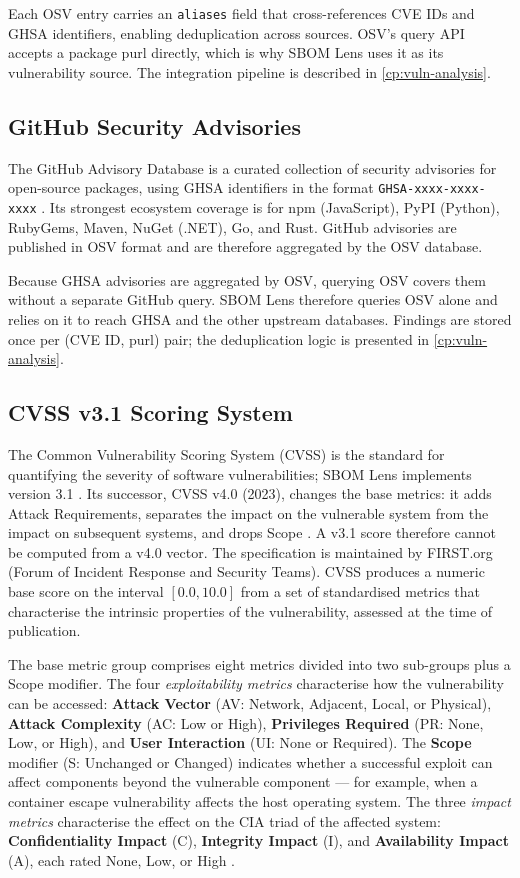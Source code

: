 Each OSV entry carries an \texttt{aliases} field that cross-references CVE IDs and GHSA identifiers, enabling deduplication across sources. OSV's query API accepts a package purl directly, which is why SBOM Lens uses it as its vulnerability source. The integration pipeline is described in \autoref{cp:vuln-analysis}.


\subsection{GitHub Security Advisories}
\label{sec:ghsa}

The GitHub Advisory Database is a curated collection of security advisories for open-source packages, using GHSA identifiers in the format \texttt{GHSA-xxxx-xxxx-xxxx} \citep{GHSA}. Its strongest ecosystem coverage is for npm (JavaScript), PyPI (Python), RubyGems, Maven, NuGet (.NET), Go, and Rust. GitHub advisories are published in OSV format and are therefore aggregated by the OSV database.

Because GHSA advisories are aggregated by OSV, querying OSV covers them without a separate GitHub query. SBOM Lens therefore queries OSV alone and relies on it to reach GHSA and the other upstream databases. Findings are stored once per (CVE ID, purl) pair; the deduplication logic is presented in \autoref{cp:vuln-analysis}.


\subsection{CVSS v3.1 Scoring System}
\label{sec:cvss}

The Common Vulnerability Scoring System (CVSS) is the standard for quantifying the severity of software vulnerabilities; SBOM Lens implements version 3.1 \citep{CVSS31}. Its successor, CVSS v4.0 (2023), changes the base metrics: it adds Attack Requirements, separates the impact on the vulnerable system from the impact on subsequent systems, and drops Scope \citep{CVSS40}. A v3.1 score therefore cannot be computed from a v4.0 vector. The specification is maintained by FIRST.org (Forum of Incident Response and Security Teams). CVSS produces a numeric base score on the interval \([0.0, 10.0]\) from a set of standardised metrics that characterise the intrinsic properties of the vulnerability, assessed at the time of publication.

The base metric group comprises eight metrics divided into two sub-groups plus a Scope modifier. The four \textit{exploitability metrics} characterise how the vulnerability can be accessed: \textbf{Attack Vector} (AV: Network, Adjacent, Local, or Physical), \textbf{Attack Complexity} (AC: Low or High), \textbf{Privileges Required} (PR: None, Low, or High), and \textbf{User Interaction} (UI: None or Required). The \textbf{Scope} modifier (S: Unchanged or Changed) indicates whether a successful exploit can affect components beyond the vulnerable component --- for example, when a container escape vulnerability affects the host operating system. The three \textit{impact metrics} characterise the effect on the CIA triad of the affected system: \textbf{Confidentiality Impact} (C), \textbf{Integrity Impact} (I), and \textbf{Availability Impact} (A), each rated None, Low, or High \citep{CVSS31}.

